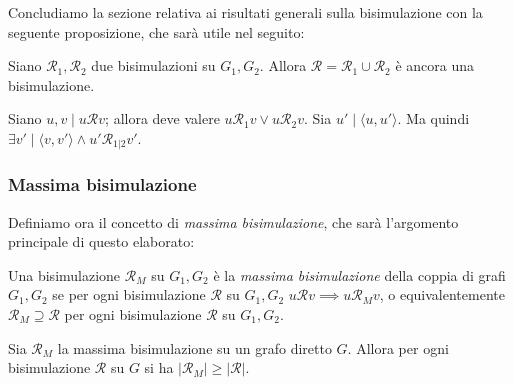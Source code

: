 Concludiamo la sezione relativa ai risultati generali sulla bisimulazione con la seguente proposizione, che sarà utile nel seguito:
\begin{proposition}
    Siano $\mathcal{R}_1, \mathcal{R}_2$ due bisimulazioni su $G_1, G_2$. Allora $\mathcal{R} = \mathcal{R}_1 \cup \mathcal{R}_2$ è ancora una bisimulazione.
    \label{obs:bisimulation_union}
\end{proposition}
\begin{proof2}
    Siano $u,v \mid u \mathcal{R} v$; allora deve valere $u \mathcal{R}_1 v \lor u \mathcal{R}_2 v$. Sia $u' \mid \langle u, u' \rangle$. Ma quindi $\exists v' \mid \langle v,v' \rangle \land u' \mathcal{R}_{1|2} v'$.
\end{proof2}

\subsubsection{Massima bisimulazione}
\label{sec:bisi_max}
Definiamo ora il concetto di \emph{massima bisimulazione}, che sarà l'argomento principale di questo elaborato:
\begin{definition}
    Una bisimulazione $\mathcal{R}_M$ su $G_1, G_2$ è la \emph{massima bisimulazione} della coppia di grafi $G_1, G_2$ se per ogni bisimulazione $\mathcal{R}$ su $G_1,G_2 \,\, u \mathcal{R} v \implies u \mathcal{R}_M v$, o equivalentemente $\mathcal{R}_M \supseteq \mathcal{R}$ per ogni bisimulazione $\mathcal{R}$ su $G_1, G_2$.
\end{definition}

\begin{observation}
    Sia $\mathcal{R}_M$ la massima bisimulazione su un grafo diretto $G$. Allora per ogni bisimulazione $\mathcal{R}$ su $G$ si ha $|\mathcal{R}_M| \geq |\mathcal{R}|$.
\end{observation}

